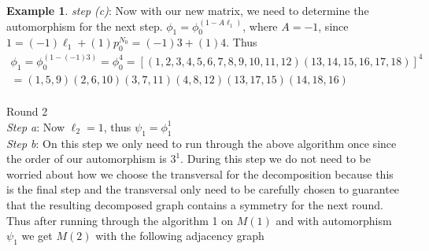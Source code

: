 \documentclass[preprint,12pt]{elsarticle}
\theoremstyle{definition}
\newtheorem{example}[thm]{Example}
\theoremstyle{remark}
\renewcommand{\emph}{\textit}
\begin{document}
\begin{example}
\emph{step (c)}: Now with our new matrix, we need to determine the automorphism for the next step.
$\phi_{1}=\phi_0^{(1-A\ell_{1})}$, where $A=-1$, since $1=(-1)\ell_{1}+(1)p_0^{N_0}=(-1)3+(1)4$.  Thus \begin{align*}
\phi_{1}=\phi_0^{(1-(-1)3)}=\phi_0^4=[(1,2,3,4,5,6,7,8,9,10,11,12)(13,14,15,16,17,18)]^4\\
=(1,5,9)(2,6,10)(3,7,11)(4,8,12)(13,17,15)(14,18,16)
\end{align*}
\\
Round 2\\
\emph{Step a}: Now $\ell_2=1$, thus $\psi_1=\phi_1^1$\\

\noindent \emph{Step b}: On this step we only need to run through the above algorithm once since the order of our automorphism is $3^1$.  During this step we do not need to be worried about how we choose the transversal for the decomposition because this is the final step and the transversal only need to be carefully chosen to guarantee that the resulting decomposed graph contains a symmetry for the next round. Thus after running through the algorithm 1 on $M(1)$ and with automorphism $\psi_1$ we get $M(2)$ with the following adjacency graph


\end{example}
\end{document}
